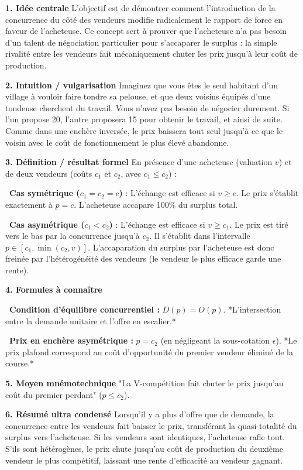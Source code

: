 \documentclass[11pt, a4paper]{report}
\begin{document}
\textbf{1. Idée centrale}
L'objectif est de démontrer comment l'introduction de la concurrence du côté des vendeurs modifie radicalement le rapport de force en faveur de l'acheteuse. Ce concept sert à prouver que l'acheteuse n'a pas besoin d'un talent de négociation particulier pour s'accaparer le surplus : la simple rivalité entre les vendeurs fait mécaniquement chuter les prix jusqu'à leur coût de production.

\textbf{2. Intuition / vulgarisation}
Imaginez que vous êtes le seul habitant d'un village à vouloir faire tondre sa pelouse, et que deux voisins équipés d'une tondeuse cherchent du travail. Vous n'avez pas besoin de négocier durement. Si l'un propose 20\texteuro{}, l'autre proposera 15\texteuro{} pour obtenir le travail, et ainsi de suite. Comme dans une enchère inversée, le prix baissera tout seul jusqu'à ce que le voisin avec le coût de fonctionnement le plus élevé abandonne.

\textbf{3. Définition / résultat formel}
En présence d'une acheteuse (valuation $v$) et de deux vendeurs (coûts $c_1$ et $c_2$, avec $c_1 \le c_2$) :
\par \textbullet\ \textbf{Cas symétrique ($c_1 = c_2 = c$)} : L'échange est efficace si $v \ge c$. Le prix s'établit exactement à $p = c$. L'acheteuse accapare 100\% du surplus total.
\par \textbullet\ \textbf{Cas asymétrique ($c_1 < c_2$)} : L'échange est efficace si $v \ge c_1$. Le prix est tiré vers le bas par la concurrence jusqu'à $c_2$. Il s'établit dans l'intervalle $p \in [c_1, \min(c_2, v)]$. L'accaparation du surplus par l'acheteuse est donc freinée par l'hétérogénéité des vendeurs (le vendeur le plus efficace garde une rente).

\textbf{4. Formules à connaître}
\par \textbullet\ \textbf{Condition d'équilibre concurrentiel :} $D(p) = O(p)$. *L'intersection entre la demande unitaire et l'offre en escalier.*
\par \textbullet\ \textbf{Prix en enchère asymétrique :} $p = c_2$ (en négligeant la sous-cotation $\epsilon$). *Le prix plafond correspond au coût d'opportunité du premier vendeur éliminé de la course.*

\textbf{5. Moyen mnémotechnique}
"La V-compétition fait chuter le prix jusqu'au coût du premier perdant" ($p \le c_2$). 

\textbf{6. Résumé ultra condensé}
Lorsqu'il y a plus d'offre que de demande, la concurrence entre les vendeurs fait baisser le prix, transférant la quasi-totalité du surplus vers l'acheteuse. Si les vendeurs sont identiques, l'acheteuse rafle tout. S'ils sont hétérogènes, le prix chute jusqu'au coût de production du deuxième vendeur le plus compétitif, laissant une rente d'efficacité au vendeur gagnant.
\end{document}

